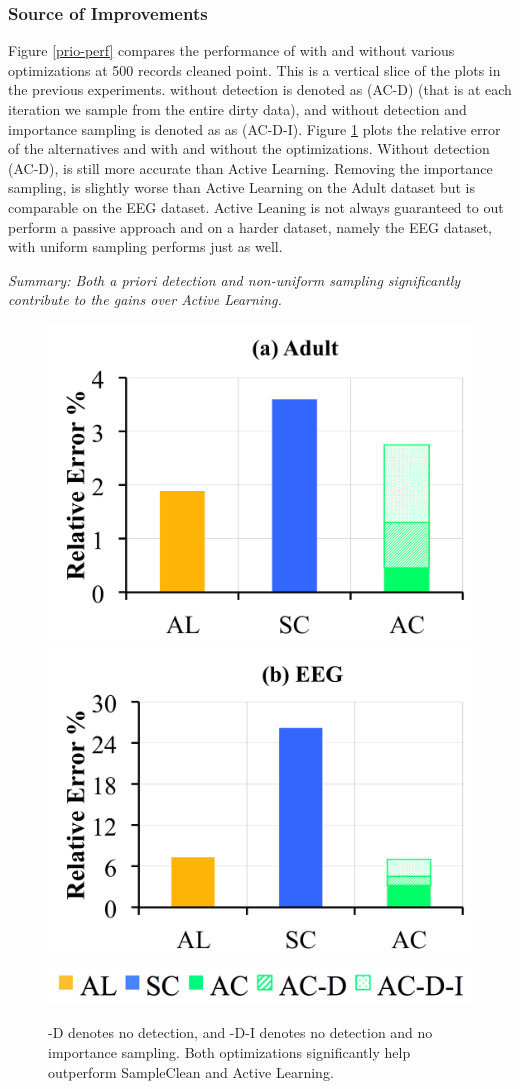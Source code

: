 \subsubsection{Source of Improvements}
Figure \ref{prio-perf} compares the performance of \sys with and without various optimizations at 500 records cleaned point. 
This is a vertical slice of the plots in the previous experiments.
\sys without detection is denoted as (AC-D) (that is at each iteration we sample from the entire dirty data), and \sys without detection and importance sampling is denoted as as (AC-D-I).
Figure \ref{opts} plots the relative error of the alternatives and \sys with and without the optimizations.
Without detection (AC-D), \sys is still more accurate than Active Learning.
Removing the importance sampling, \sys is slightly worse than Active Learning on the Adult dataset but is comparable on the EEG dataset.
Active Leaning is not always guaranteed to out perform a passive approach and on a harder dataset, namely the EEG dataset, \sys with uniform sampling performs just as well.

\vspace{0.25em}

\noindent \emph{Summary: Both a priori detection and non-uniform sampling significantly contribute to the gains over Active Learning.}

\begin{figure}[ht!]
\centering
 \includegraphics[width=0.49\columnwidth]{exp/exp8a.png}
 \includegraphics[width=0.49\columnwidth]{exp/exp8b.png}
 \includegraphics[width=0.5\columnwidth]{exp/legend-8.png}\vspace{-1em}
 \caption{ -D denotes no detection, and -D-I denotes no detection and no importance sampling. Both optimizations significantly help \sys outperform SampleClean and Active Learning. \label{opts}}\vspace{-1.5em}
\end{figure}

